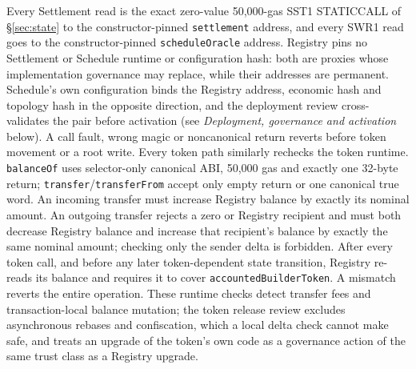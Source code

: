 \documentclass[a4paper,11pt]{article}
\newcommand{\code}[1]{\nolinkurl{#1}}
\begin{document}
Every Settlement read is the exact zero-value 50,000-gas SST1 STATICCALL of
\S\ref{sec:state} to the constructor-pinned \code{settlement} address, and
every SWR1 read goes to the constructor-pinned \code{scheduleOracle} address.
Registry pins no Settlement or Schedule runtime or configuration hash: both
are proxies whose implementation governance may replace, while their
addresses are permanent.  Schedule's own configuration binds the Registry
address, economic hash and topology hash in the opposite direction, and the
deployment review cross-validates the pair before activation (see
\emph{Deployment, governance and activation} below).  A call fault, wrong
magic or noncanonical return reverts before token movement or a root write.
Every token path similarly rechecks the token runtime.  \code{balanceOf}
uses selector-only canonical ABI, 50,000 gas and exactly one 32-byte return;
\code{transfer}/\code{transferFrom} accept only empty return or one canonical
true word.  An incoming transfer must increase Registry balance by exactly its
nominal amount.  An outgoing transfer rejects a zero or Registry recipient and
must both decrease Registry balance and increase that recipient's balance by
exactly the same nominal amount; checking only the sender delta is forbidden.
After every token call, and before any later token-dependent state transition,
Registry re-reads its balance and requires it to cover
\code{accountedBuilderToken}.  A mismatch reverts the entire operation.
These runtime checks detect transfer fees and transaction-local balance
mutation; the token release review excludes asynchronous rebases and
confiscation, which a local delta check cannot make safe, and treats an
upgrade of the token's own code as a governance action of the same trust class
as a Registry upgrade.
\end{document}
